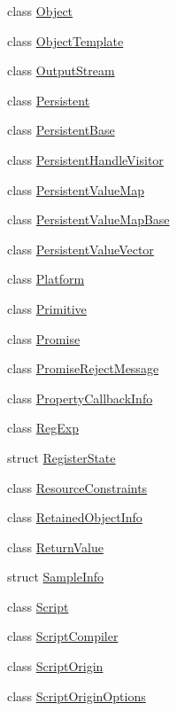 \begin{DoxyCompactItemize}
\item 
class \hyperlink{classv8_1_1Object}{Object}
\item 
class \hyperlink{classv8_1_1ObjectTemplate}{Object\+Template}
\item 
class \hyperlink{classv8_1_1OutputStream}{Output\+Stream}
\item 
class \hyperlink{classv8_1_1Persistent}{Persistent}
\item 
class \hyperlink{classv8_1_1PersistentBase}{Persistent\+Base}
\item 
class \hyperlink{classv8_1_1PersistentHandleVisitor}{Persistent\+Handle\+Visitor}
\item 
class \hyperlink{classv8_1_1PersistentValueMap}{Persistent\+Value\+Map}
\item 
class \hyperlink{classv8_1_1PersistentValueMapBase}{Persistent\+Value\+Map\+Base}
\item 
class \hyperlink{classv8_1_1PersistentValueVector}{Persistent\+Value\+Vector}
\item 
class \hyperlink{classv8_1_1Platform}{Platform}
\item 
class \hyperlink{classv8_1_1Primitive}{Primitive}
\item 
class \hyperlink{classv8_1_1Promise}{Promise}
\item 
class \hyperlink{classv8_1_1PromiseRejectMessage}{Promise\+Reject\+Message}
\item 
class \hyperlink{classv8_1_1PropertyCallbackInfo}{Property\+Callback\+Info}
\item 
class \hyperlink{classv8_1_1RegExp}{Reg\+Exp}
\item 
struct \hyperlink{structv8_1_1RegisterState}{Register\+State}
\item 
class \hyperlink{classv8_1_1ResourceConstraints}{Resource\+Constraints}
\item 
class \hyperlink{classv8_1_1RetainedObjectInfo}{Retained\+Object\+Info}
\item 
class \hyperlink{classv8_1_1ReturnValue}{Return\+Value}
\item 
struct \hyperlink{structv8_1_1SampleInfo}{Sample\+Info}
\item 
class \hyperlink{classv8_1_1Script}{Script}
\item 
class \hyperlink{classv8_1_1ScriptCompiler}{Script\+Compiler}
\item 
class \hyperlink{classv8_1_1ScriptOrigin}{Script\+Origin}
\item 
class \hyperlink{classv8_1_1ScriptOriginOptions}{Script\+Origin\+Options}

\end{DoxyCompactItemize}
